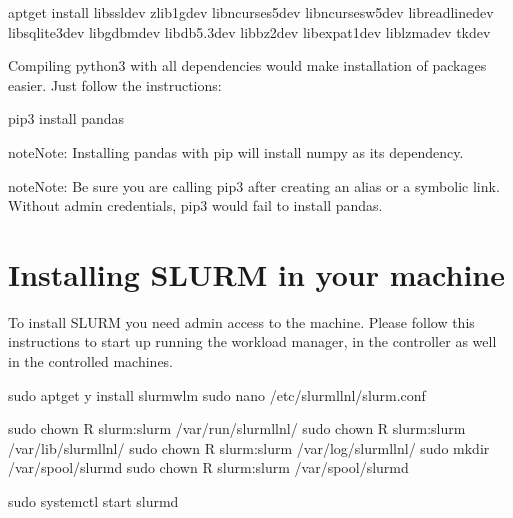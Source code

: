 \documentclass[letterpaper,10pt,english]{sphinxmanual}
\begin{document}
\begin{sphinxVerbatim}[commandchars=\\\{\}]
apt\PYGZhy{}get install libssl\PYGZhy{}dev zlib1g\PYGZhy{}dev libncurses5\PYGZhy{}dev 
libncursesw5\PYGZhy{}dev libreadline\PYGZhy{}dev libsqlite3\PYGZhy{}dev libgdbm\PYGZhy{}dev 
libdb5.3\PYGZhy{}dev libbz2\PYGZhy{}dev libexpat1\PYGZhy{}dev liblzma\PYGZhy{}dev tk\PYGZhy{}dev
\end{sphinxVerbatim}

Compiling python3 with all dependencies would make installation of packages
easier. Just follow the instructions:

\begin{sphinxVerbatim}[commandchars=\\\{\}]
pip3 install pandas
\end{sphinxVerbatim}

\begin{sphinxadmonition}{note}{Note:}
Installing pandas with pip will install numpy as its dependency.
\end{sphinxadmonition}

\begin{sphinxadmonition}{note}{Note:}
Be sure you are calling pip3 after creating an alias or a symbolic link.
Without admin credentials, pip3 would fail to install pandas.
\end{sphinxadmonition}


\chapter{Installing SLURM in your machine}
\label{\detokenize{SLURM:installing-slurm-in-your-machine}}\label{\detokenize{SLURM:slurm-instructions}}\label{\detokenize{SLURM::doc}}
To install SLURM you need admin access to the machine. Please follow this
instructions to start up running the workload manager, in the controller as well
in the controlled machines.

\begin{sphinxVerbatim}[commandchars=\\\{\}]
sudo apt\PYGZhy{}get \PYGZhy{}y install slurm\PYGZhy{}wlm
sudo nano /etc/slurm\PYGZhy{}llnl/slurm.conf

sudo chown \PYGZhy{}R slurm:slurm /var/run/slurm\PYGZhy{}llnl/
sudo chown \PYGZhy{}R slurm:slurm /var/lib/slurm\PYGZhy{}llnl/
sudo chown \PYGZhy{}R slurm:slurm /var/log/slurm\PYGZhy{}llnl/
sudo mkdir /var/spool/slurmd
sudo chown \PYGZhy{}R slurm:slurm /var/spool/slurmd

sudo systemctl start slurmd
\end{sphinxVerbatim}
\end{document}
